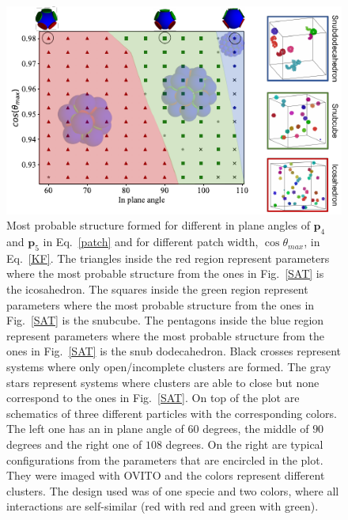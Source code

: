 \documentclass[a4paper, amsfonts, amssymb, amsmath, reprint, showkeys, nofootinbib, twoside]{revtex4-1}
\begin{document}
\begin{figure}[t]
	\includegraphics{fig3.pdf}
	\caption{\label{N1c2} Most probable structure formed for different in plane angles of $\textbf{p}_4$ and $\textbf{p}_5$ in Eq.~\ref{patch} and for different patch width, $\cos\theta_{max}$, in Eq.~\ref{KF}. The triangles inside the red region represent parameters where the most probable structure from the ones in Fig.~\ref{SAT} is the icosahedron. The squares inside the green region represent parameters where the most probable structure from the ones in Fig.~\ref{SAT} is the snubcube. The pentagons inside the blue region represent parameters where the most probable structure from the ones in Fig.~\ref{SAT} is the snub dodecahedron. Black crosses represent systems where only open/incomplete clusters are formed. The gray stars represent systems where clusters are able to close but none correspond to the ones in Fig.~\ref{SAT}. On top of the plot are schematics of three different particles with the corresponding colors. The left one has an in plane angle of $60$ degrees, the middle of $90$ degrees and the right one of $108$ degrees. On the right are typical configurations from the parameters that are encircled in the plot. They were imaged with OVITO and the colors represent different clusters. The design used was of one specie and two colors, where all interactions are self-similar (red with red and green with green).}
\end{figure}
\end{document}
